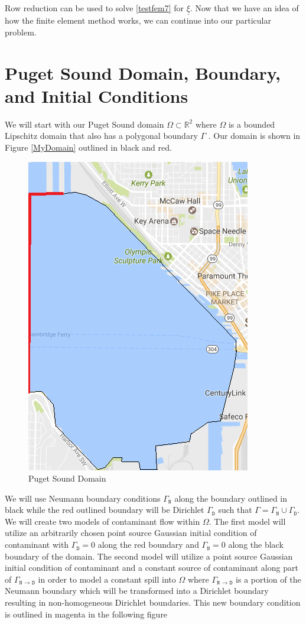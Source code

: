 \documentclass[a4paper]{article}
\theoremstyle{remark}
\theoremstyle{remark}
\begin{document}
\noindent Row reduction can be used to solve \eqref{testfem7} for $\underline{\xi}$. Now that we have an idea of how the finite element method works, we can continue into our particular problem.

\section{Puget Sound Domain, Boundary, and Initial Conditions} \label{DomainSection}
We will start with our Puget Sound domain $\Omega \subset \mathbb{R}^{2}$ where $\Omega$ is a bounded Lipschitz domain that also has a polygonal boundary $\Gamma$ \cite{50LinesofMATLAB}. Our domain is shown in Figure \ref{MyDomain} outlined in black and red.
\begin{figure}[H]\label{MyDomain}
   
\centering   
   \includegraphics[width=0.4\linewidth]{domainoutline.png}
    \caption{Puget Sound Domain}
    \label{pugetsounddomain}
\end{figure}

We will use Neumann boundary conditions $\Gamma_{\texttt{N}}$ along the boundary outlined in black while the red outlined boundary will be Dirichlet $\Gamma_{\texttt{D}}$ such that $\Gamma = \Gamma_{\texttt{N}} \cup \Gamma_{\texttt{D}}$. We will create two models of contaminant flow within $\Omega$. The first model will utilize an arbitrarily chosen point source Gaussian initial condition of contaminant with $\Gamma_{\texttt{D}}=0$ along the red boundary and $\Gamma_{\texttt{N}}=0$ along the black boundary of the domain. The second model will utilize a point source Gaussian initial condition of contaminant and a constant source of contaminant along part of $\Gamma_{\texttt{N $\rightarrow$ D}}$ in order to model a constant spill into $\Omega$ where $\Gamma_{\texttt{N $\rightarrow$ D}}$ is a portion of the Neumann boundary which will be transformed into a Dirichlet boundary resulting in non-homogeneous Dirichlet boundaries. This new boundary condition is outlined in magenta in the following figure
\end{document}
